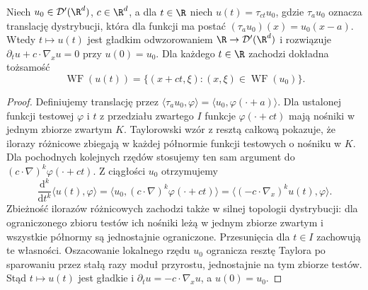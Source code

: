 \begin{twierdzenie}
\label{thm:pde31-transport-wf}
Niech $u_0\in\mathcal D'(\R^d)$, $c\in\R^d$,
a dla $t\in\R$ niech $u(t)=\tau_{ct}u_0$,
gdzie $\tau_a u_0$ oznacza translację dystrybucji,
która dla funkcji ma postać $(\tau_a u_0)(x)=u_0(x-a)$.
Wtedy $t\mapsto u(t)$ jest gładkim odwzorowaniem
$\R\to\mathcal D'(\R^d)$ i rozwiązuje
$\partial_tu+c\cdot\nabla_xu=0$ przy $u(0)=u_0$.
Dla każdego $t\in\R$ zachodzi dokładna tożsamość
\begin{equation}\label{eq:pde31-transport-wf}
 \operatorname{WF}(u(t))=
 \{(x+ct,\xi):(x,\xi)\in\operatorname{WF}(u_0)\}.
\end{equation}
\end{twierdzenie}
\begin{proof}
Definiujemy translację przez
$\langle\tau_a u_0,\varphi\rangle
=\langle u_0,\varphi(\cdot+a)\rangle$.
Dla ustalonej funkcji testowej $\varphi$
i $t$ z przedziału zwartego $I$ funkcje
$\varphi(\cdot+ct)$ mają nośniki w jednym
zbiorze zwartym $K$. Taylorowski wzór z resztą
całkową pokazuje, że ilorazy różnicowe
zbiegają w każdej półnormie funkcji testowych
o nośniku w $K$. Dla pochodnych kolejnych rzędów
stosujemy ten sam argument do
$(c\cdot\nabla)^k\varphi(\cdot+ct)$.
Z ciągłości $u_0$ otrzymujemy
\[
 \frac{\mathrm d^k}{\mathrm dt^k}
 \langle u(t),\varphi\rangle
 =\langle u_0,(c\cdot\nabla)^k\varphi(\cdot+ct)\rangle
 =\langle(-c\cdot\nabla_x)^k u(t),\varphi\rangle .
\]
Zbieżność ilorazów różnicowych zachodzi także
w silnej topologii dystrybucji: dla ograniczonego
zbioru testów ich nośniki leżą w jednym zbiorze
zwartym i wszystkie półnormy są jednostajnie
ograniczone. Przesunięcia dla $t\in I$
zachowują te własności. Oszacowanie lokalnego
rzędu $u_0$ ogranicza resztę Taylora
po sparowaniu przez stałą razy moduł przyrostu,
jednostajnie na tym zbiorze testów.
Stąd $t\mapsto u(t)$ jest gładkie i
$\partial_tu=-c\cdot\nabla_xu$, a $u(0)=u_0$.


\end{proof}

